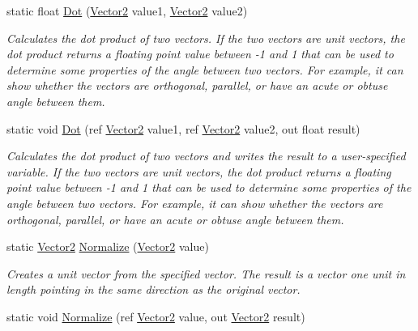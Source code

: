 \begin{DoxyCompactItemize}
static float \hyperlink{struct_microsoft_1_1_xna_1_1_framework_1_1_vector2_a11d1631119a63b47d126ec8c6514158a}{Dot} (\hyperlink{struct_microsoft_1_1_xna_1_1_framework_1_1_vector2}{Vector2} value1, \hyperlink{struct_microsoft_1_1_xna_1_1_framework_1_1_vector2}{Vector2} value2)
\begin{DoxyCompactList}\small\item\em Calculates the dot product of two vectors. If the two vectors are unit vectors, the dot product returns a floating point value between -\/1 and 1 that can be used to determine some properties of the angle between two vectors. For example, it can show whether the vectors are orthogonal, parallel, or have an acute or obtuse angle between them.\end{DoxyCompactList}\item 
static void \hyperlink{struct_microsoft_1_1_xna_1_1_framework_1_1_vector2_a5e1961565b5a29f77cd27f2e2322bc98}{Dot} (ref \hyperlink{struct_microsoft_1_1_xna_1_1_framework_1_1_vector2}{Vector2} value1, ref \hyperlink{struct_microsoft_1_1_xna_1_1_framework_1_1_vector2}{Vector2} value2, out float result)
\begin{DoxyCompactList}\small\item\em Calculates the dot product of two vectors and writes the result to a user-\/specified variable. If the two vectors are unit vectors, the dot product returns a floating point value between -\/1 and 1 that can be used to determine some properties of the angle between two vectors. For example, it can show whether the vectors are orthogonal, parallel, or have an acute or obtuse angle between them.\end{DoxyCompactList}\item 
static \hyperlink{struct_microsoft_1_1_xna_1_1_framework_1_1_vector2}{Vector2} \hyperlink{struct_microsoft_1_1_xna_1_1_framework_1_1_vector2_a43577b900b79e2cca19017a9764110fa}{Normalize} (\hyperlink{struct_microsoft_1_1_xna_1_1_framework_1_1_vector2}{Vector2} value)
\begin{DoxyCompactList}\small\item\em Creates a unit vector from the specified vector. The result is a vector one unit in length pointing in the same direction as the original vector.\end{DoxyCompactList}\item 
static void \hyperlink{struct_microsoft_1_1_xna_1_1_framework_1_1_vector2_af13c3a68dca222883321eace82b5249d}{Normalize} (ref \hyperlink{struct_microsoft_1_1_xna_1_1_framework_1_1_vector2}{Vector2} value, out \hyperlink{struct_microsoft_1_1_xna_1_1_framework_1_1_vector2}{Vector2} result)

\end{DoxyCompactItemize}

